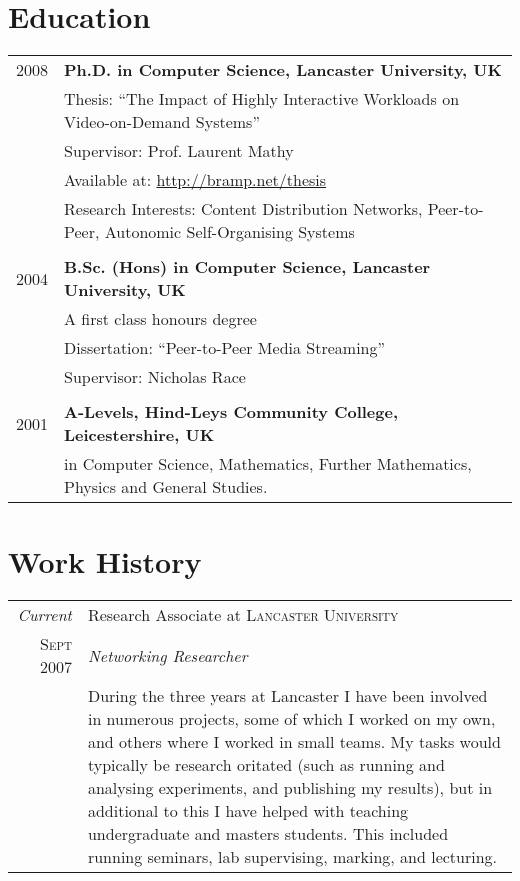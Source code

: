 \documentclass[a4paper,10pt]{article}
\begin{document}
\section{Education}
\begin{tabular}{rl}	
 \textsc{2008} & \textbf{Ph.D. in Computer Science, Lancaster University, UK}\\
& Thesis: ``The Impact of Highly Interactive Workloads on Video-on-Demand Systems''\\
& Supervisor: Prof. Laurent Mathy\\
& Available at: \href{http://bramp.net/thesis}{http://bramp.net/thesis}\\
& Research Interests: Content Distribution Networks, Peer-to-Peer, Autonomic Self-Organising Systems\\
&\\

\textsc{2004} & \textbf{B.Sc. (Hons) in Computer Science, Lancaster University, UK}\\
& A first class honours degree\\
& Dissertation: ``Peer-to-Peer Media Streaming''\\
& Supervisor: Nicholas Race\\
&\\

\textsc{2001} & \textbf{A-Levels, Hind-Leys Community College, Leicestershire, UK}\\
& in Computer Science, Mathematics, Further Mathematics, Physics and General Studies.\\

\end{tabular}

\section{Work History}
\begin{tabular}{r|p{11cm}}
 \emph{Current} & Research Associate at \textsc{Lancaster University} \\
 \textsc{Sept 2007} & \emph{Networking Researcher}\\
&\footnotesize During the three years at Lancaster I have been involved in numerous projects, some of which I worked on my own, and others where I worked in small teams. My tasks would typically be research oritated (such as running and analysing experiments, and publishing my results), but in additional to this I have helped with teaching undergraduate and masters students. This included running seminars, lab supervising, marking, and lecturing.\\


\end{tabular}
\end{document}
